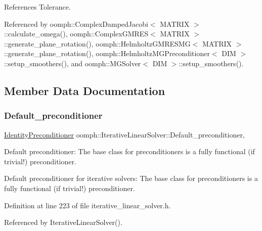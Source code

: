 References Tolerance.



Referenced by oomph\+::\+Complex\+Damped\+Jacobi$<$ M\+A\+T\+R\+I\+X $>$\+::calculate\+\_\+omega(), oomph\+::\+Complex\+G\+M\+R\+E\+S$<$ M\+A\+T\+R\+I\+X $>$\+::generate\+\_\+plane\+\_\+rotation(), oomph\+::\+Helmholtz\+G\+M\+R\+E\+S\+M\+G$<$ M\+A\+T\+R\+I\+X $>$\+::generate\+\_\+plane\+\_\+rotation(), oomph\+::\+Helmholtz\+M\+G\+Preconditioner$<$ D\+I\+M $>$\+::setup\+\_\+smoothers(), and oomph\+::\+M\+G\+Solver$<$ D\+I\+M $>$\+::setup\+\_\+smoothers().



\subsection{Member Data Documentation}
\mbox{\label{classoomph_1_1IterativeLinearSolver_a8393d99578cbee0fdb937ddec34be74c}} 
\subsubsection{\texorpdfstring{Default\+\_\+preconditioner}{Default\_preconditioner}}
{\footnotesize\ttfamily \hyperlink{classoomph_1_1IdentityPreconditioner}{Identity\+Preconditioner} oomph\+::\+Iterative\+Linear\+Solver\+::\+Default\+\_\+preconditioner\hspace{0.3cm}{\ttfamily [static]}, {\ttfamily [protected]}}



Default preconditioner\+: The base class for preconditioners is a fully functional (if trivial!) preconditioner. 

Default preconditioner for iterative solvers\+: The base class for preconditioners is a fully functional (if trivial!) preconditioner. 

Definition at line 223 of file iterative\+\_\+linear\+\_\+solver.\+h.



Referenced by Iterative\+Linear\+Solver().

\mbox{\label{classoomph_1_1IterativeLinearSolver_aeb0fbe103e721196232260230abb1997}} 
